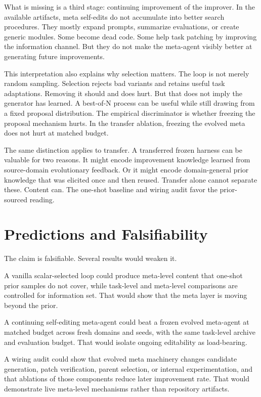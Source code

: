 \documentclass[11pt]{article}
\begin{document}
What is missing is a third stage: continuing improvement of the improver. In the available artifacts, meta self-edits do not accumulate into better search procedures. They mostly expand prompts, summarize evaluations, or create generic modules. Some become dead code. Some help task patching by improving the information channel. But they do not make the meta-agent visibly better at generating future improvements.

This interpretation also explains why selection matters. The loop is not merely random sampling. Selection rejects bad variants and retains useful task adaptations. Removing it should and does hurt. But that does not imply the generator has learned. A best-of-N process can be useful while still drawing from a fixed proposal distribution. The empirical discriminator is whether freezing the proposal mechanism hurts. In the transfer ablation, freezing the evolved meta does not hurt at matched budget.

The same distinction applies to transfer. A transferred frozen harness can be valuable for two reasons. It might encode improvement knowledge learned from source-domain evolutionary feedback. Or it might encode domain-general prior knowledge that was elicited once and then reused. Transfer alone cannot separate these. Content can. The one-shot baseline and wiring audit favor the prior-sourced reading.

\section{Predictions and Falsifiability}\label{predictions-and-falsifiability}

The claim is falsifiable. Several results would weaken it.

A vanilla scalar-selected loop could produce meta-level content that one-shot prior samples do not cover, while task-level and meta-level comparisons are controlled for information set. That would show that the meta layer is moving beyond the prior.

A continuing self-editing meta-agent could beat a frozen evolved meta-agent at matched budget across fresh domains and seeds, with the same task-level archive and evaluation budget. That would isolate ongoing editability as load-bearing.

A wiring audit could show that evolved meta machinery changes candidate generation, patch verification, parent selection, or internal experimentation, and that ablations of those components reduce later improvement rate. That would demonstrate live meta-level mechanisms rather than repository artifacts.
\end{document}
